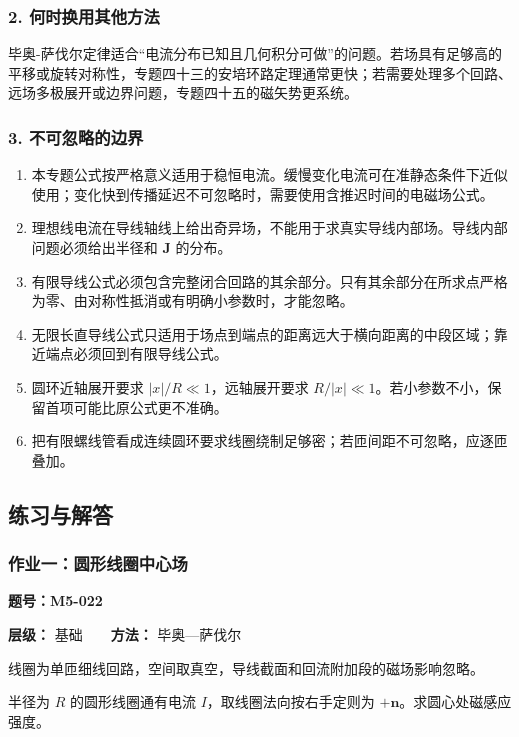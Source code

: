 \subsubsection{2.
何时换用其他方法}\label{m5:ux4f55ux65f6ux6362ux7528ux5176ux4ed6ux65b9ux6cd5}

毕奥-萨伐尔定律适合``电流分布已知且几何积分可做''的问题。若场具有足够高的平移或旋转对称性，专题四十三的安培环路定理通常更快；若需要处理多个回路、远场多极展开或边界问题，专题四十五的磁矢势更系统。

\subsubsection{3.
不可忽略的边界}\label{m5:ux4e0dux53efux5ffdux7565ux7684ux8fb9ux754c}

\begin{enumerate}
\def\labelenumi{\arabic{enumi}.}
\tightlist
\item
  本专题公式按严格意义适用于稳恒电流。缓慢变化电流可在准静态条件下近似使用；变化快到传播延迟不可忽略时，需要使用含推迟时间的电磁场公式。
\item
  理想线电流在导线轴线上给出奇异场，不能用于求真实导线内部场。导线内部问题必须给出半径和
  \(\mathbf J\) 的分布。
\item
  有限导线公式必须包含完整闭合回路的其余部分。只有其余部分在所求点严格为零、由对称性抵消或有明确小参数时，才能忽略。
\item
  无限长直导线公式只适用于场点到端点的距离远大于横向距离的中段区域；靠近端点必须回到有限导线公式。
\item
  圆环近轴展开要求 \(|x|/R\ll1\)，远轴展开要求
  \(R/|x|\ll1\)。若小参数不小，保留首项可能比原公式更不准确。
\item
  把有限螺线管看成连续圆环要求线圈绕制足够密；若匝间距不可忽略，应逐匝叠加。
\end{enumerate}

\subsection{练习与解答}\label{m5:ux7ec3ux4e60ux4e0eux89e3ux7b54}

\par{}
\noindent\begin{minipage}{\linewidth}

\subsubsection{作业一：圆形线圈中心场}\label{m5:ux4f5cux4e1aux4e00ux5706ux5f62ux7ebfux5708ux4e2dux5fc3ux573a}

\textbf{题号：M5-022}

\textbf{层级：} 基础　　\textbf{方法：} 毕奥---萨伐尔

线圈为单匝细线回路，空间取真空，导线截面和回流附加段的磁场影响忽略。

半径为 \(R\) 的圆形线圈通有电流 \(I\)，取线圈法向按右手定则为
\(+\mathbf n\)。求圆心处磁感应强度。

\end{minipage}\par

